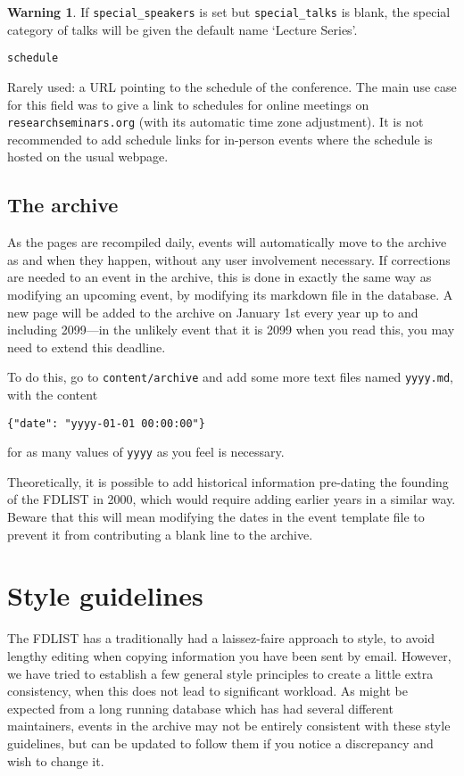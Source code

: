 \documentclass[12pt]{scrartcl}
\theoremstyle{definition}
\newtheorem*{warn}{Warning}
\begin{document}
\begin{warn}
If \verb|special_speakers| is set but \verb|special_talks| is blank, the special category of talks will be given the default name `Lecture Series'.
\end{warn}

\noindent\verb|schedule|\nopagebreak

Rarely used: a URL pointing to the schedule of the conference.
The main use case for this field was to give a link to schedules for online meetings on \verb|researchseminars.org| (with its automatic time zone adjustment).
It is not recommended to add schedule links for in-person events where the schedule is hosted on the usual webpage.

\subsection{The archive}
As the pages are recompiled daily, events will automatically move to the archive as and when they happen, without any user involvement necessary.
If corrections are needed to an event in the archive, this is done in exactly the same way as modifying an upcoming event, by modifying its markdown file in the database.
A new page will be added to the archive on January 1st every year up to and including 2099---in the unlikely event that it is 2099 when you read this, you may need to extend this deadline.

To do this, go to \verb|content/archive| and add some more text files named \verb|yyyy.md|, with the content
\begin{center}
\verb|{"date": "yyyy-01-01 00:00:00"}|
\end{center}
for as many values of \verb|yyyy| as you feel is necessary.

Theoretically, it is possible to add historical information pre-dating the founding of the FDLIST in 2000, which would require adding earlier years in a similar way.
Beware that this will mean modifying the dates in the event template file to prevent it from contributing a blank line to the archive.

\section{Style guidelines}
\label{s:style}
The FDLIST has a traditionally had a laissez-faire approach to style, to avoid lengthy editing when copying information you have been sent by email.
However, we have tried to establish a few general style principles to create a little extra consistency, when this does not lead to significant workload.
As might be expected from a long running database which has had several different maintainers, events in the archive may not be entirely consistent with these style guidelines, but can be updated to follow them if you notice a discrepancy and wish to change it.
\end{document}
